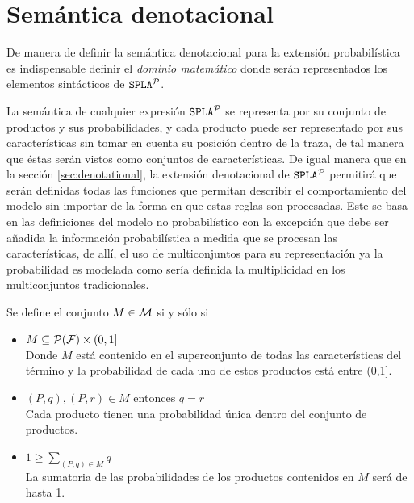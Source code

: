 \section{Semántica denotacional}
\label{sec:stat:den}

De manera de definir la semántica denotacional para la extensión
probabilística es indispensable definir el \emph{dominio matemático}
donde serán representados los elementos sintácticos de $\mathtt{SPLA{^{\cal P}}}$. 

La semántica de cualquier expresión $\mathtt{SPLA{^{\cal P}}}$
se representa por su conjunto de productos y sus probabilidades,
y cada producto puede ser representado por  sus características
sin tomar en cuenta su posición dentro de la traza, de tal manera
que éstas serán vistos como conjuntos de características.
%
De igual manera que en la sección \ref{sec:denotational}, la extensión
denotacional de $\mathtt{SPLA{^{\cal P}}}$ permitirá que serán definidas todas las
funciones que permitan describir el
comportamiento del modelo sin importar de la forma en que estas 
reglas son procesadas.
Este se basa en las definiciones del modelo
no probabilístico con la excepción que debe ser añadida la información
probabilística a medida que se procesan las características, de allí,
el uso de multiconjuntos para su representación ya la probabilidad
es modelada como sería definida la multiplicidad en los
multiconjuntos tradicionales.





\bdfn\label{def:den:pr}
  Se define el conjunto $M\in{\cal M}$ si y sólo si
  \begin{itemize}
  \item $M\subseteq {\cal P}({\cal F})\times (0,1]$ \\
  Donde $M$ está contenido en el superconjunto de todas
  las características del término y la probabilidad de 
  cada uno de estos productos está entre (0,1].
  
  \item $(P,q),(P,r)\in M$ entonces $q=r$ \\
  Cada producto tienen una probabilidad única dentro del
  conjunto de productos.
  
  \item $1\geq\sum_{(P,q)\in M} q$ \\
  La sumatoria de las probabilidades de los productos contenidos en $M$
  será de hasta 1.
  \end{itemize}
\edfn

